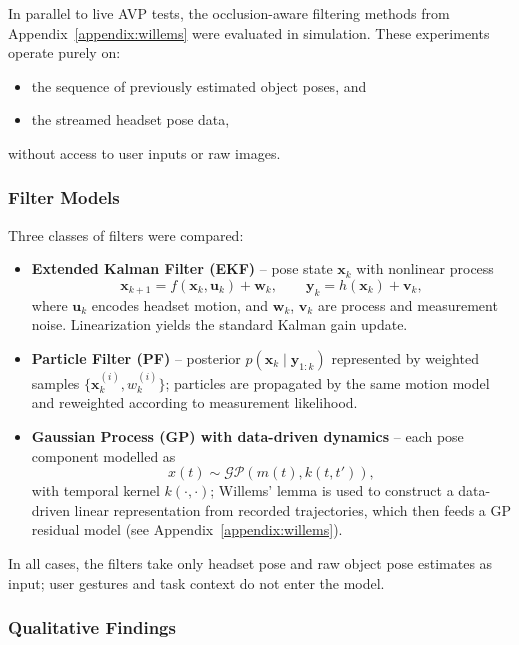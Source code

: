 In parallel to live AVP tests, the occlusion-aware filtering methods from Appendix~\ref{appendix:willems} were evaluated in simulation. These experiments operate purely on:

\begin{itemize}
    \item the sequence of previously estimated object poses, and
    \item the streamed headset pose data,
\end{itemize}

without access to user inputs or raw images.

\subsubsection{Filter Models}

Three classes of filters were compared:

\begin{itemize}
    \item \textbf{Extended Kalman Filter (EKF)} – pose state $\mathbf{x}_k$ with nonlinear process
    \[
        \mathbf{x}_{k+1} = f(\mathbf{x}_k, \mathbf{u}_k) + \mathbf{w}_k,
        \qquad
        \mathbf{y}_k = h(\mathbf{x}_k) + \mathbf{v}_k,
    \]
    where $\mathbf{u}_k$ encodes headset motion, and $\mathbf{w}_k$, $\mathbf{v}_k$ are process and measurement noise. Linearization yields the standard Kalman gain update.
    \item \textbf{Particle Filter (PF)} – posterior $p(\mathbf{x}_k \mid \mathbf{y}_{1:k})$ represented by weighted samples $\{ \mathbf{x}_k^{(i)}, w_k^{(i)} \}$; particles are propagated by the same motion model and reweighted according to measurement likelihood.
    \item \textbf{Gaussian Process (GP) with data-driven dynamics} – each pose component modelled as
    \[
        x(t) \sim \mathcal{GP}(m(t), k(t,t')),
    \]
    with temporal kernel $k(\cdot,\cdot)$; Willems’ lemma is used to construct a data-driven linear representation from recorded trajectories, which then feeds a GP residual model (see Appendix~\ref{appendix:willems}).
\end{itemize}

In all cases, the filters take only headset pose and raw object pose estimates as input; user gestures and task context do not enter the model.

\subsubsection{Qualitative Findings}


